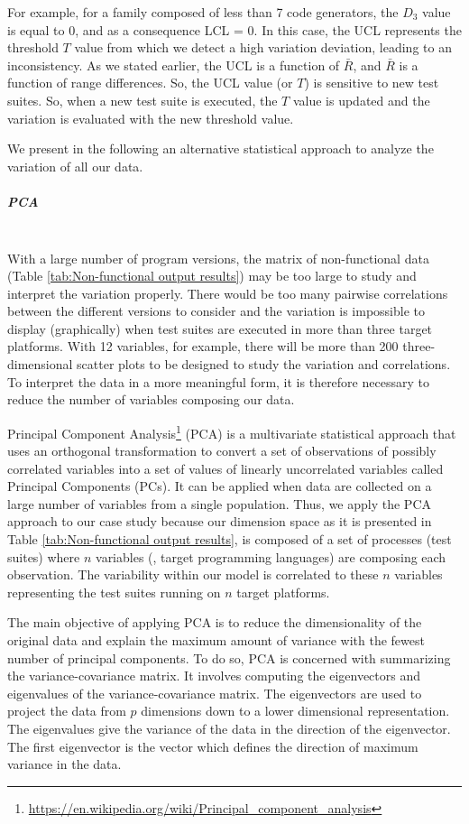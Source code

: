 For example, for a family composed of less than 7 code generators, the $D_{3}$ value is equal to $0$, and as a consequence LCL = $0$. In this case, the UCL represents the threshold $T$ value from which we detect a high variation deviation, leading to an inconsistency. As we stated earlier, the UCL is a function of $\bar{R}$, and $\bar{R}$ is a function of range differences. So, the UCL value (or $T$) is sensitive to new test suites. So, when a new test suite is executed, the $T$ value is updated and the variation is evaluated with the new threshold value. 

We present in the following an alternative statistical approach to analyze the variation of all our data.


\subparagraph{PCA}~\\
With a large number of program versions, the matrix of non-functional data (Table \ref{tab:Non-functional output results}) may be too large to study and interpret the variation properly. There would be too many pairwise correlations between the different versions to consider and the variation is impossible to display (graphically) when test suites are executed in more than three target platforms.
With 12 variables, for example, there will be more than 200 three-dimensional scatter plots to be designed to study the variation and correlations.
To interpret the data in a more meaningful form, it is therefore necessary to reduce the number of variables composing our data.

Principal Component Analysis\footnote{\url{https://en.wikipedia.org/wiki/Principal_component_analysis}} (PCA) is a multivariate statistical approach that uses an orthogonal transformation to convert a set of observations of possibly correlated variables into a set of values of linearly uncorrelated variables called Principal Components (PCs). It can be applied when data are collected on a large number of variables from a single population. Thus, we apply the PCA approach to our case study because our dimension space as it is presented in Table \ref{tab:Non-functional output results}, is composed of a set of processes (test suites) where $n$ variables (\eg, target programming languages) are composing each observation. The variability within our model is correlated to these $n$ variables representing the test suites running on $n$ target platforms. 

The main objective of applying PCA is to reduce the dimensionality of the original data and explain the maximum amount of variance with the fewest number of principal components. To do so, PCA is concerned with summarizing the variance-covariance matrix. It involves computing the eigenvectors and eigenvalues of the variance-covariance matrix. The eigenvectors are used to project the data from $p$ dimensions down to a lower dimensional representation. The eigenvalues give the variance of the data in the direction of the eigenvector. The first eigenvector is the vector which defines the direction of maximum variance in the data.

